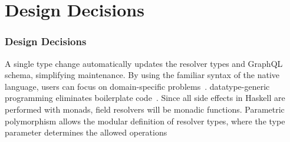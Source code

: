 
\section{Design Decisions} 

\begin{frame}\frametitle{Design Decisions}

\begin{itemize}
     A single type change automatically updates the resolver types and GraphQL schema, simplifying maintenance. 
     By using the familiar syntax of the native language, users can focus on domain-specific problems~\cite{edsl-modeling}.
    datatype-generic programming eliminates boilerplate code~\cite{scrap-your-boilerplate}.
     Since all side effects in Haskell are performed with monads, field resolvers will be monadic functions. 
     Parametric polymorphism allows the modular definition of resolver types, where the type parameter determines the allowed operations
\end{itemize}
\end{frame}